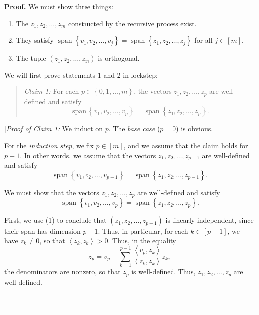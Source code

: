 \documentclass[numbers=enddot,12pt,final,onecolumn,notitlepage]{scrartcl}%
\numberwithin{exer}{subsection}
\theoremstyle{definition}
\newenvironment{statement}{\begin{quote}}{\end{quote}}
\newenvironment{proof}[1][Proof]{\noindent\textbf{#1.} }{\ \rule{0.5em}{0.5em}}
\let\sumnonlimits\sum
\renewcommand{\sum}{\sumnonlimits\limits}
\begin{document}
\begin{proof}
We must show three things:

\begin{enumerate}
\item The $z_{1},z_{2},\ldots,z_{m}$ constructed by the recursive process exist.

\item They satisfy $\operatorname*{span}\left\{  v_{1},v_{2},\ldots
,v_{j}\right\}  =\operatorname*{span}\left\{  z_{1},z_{2},\ldots
,z_{j}\right\}  $ for all $j\in\left[  m\right]  $.

\item The tuple $\left(  z_{1},z_{2},\ldots,z_{m}\right)  $ is orthogonal.
\end{enumerate}

We will first prove statements 1 and 2 in lockstep:

\begin{statement}
\textit{Claim 1:} For each $p\in\left\{  0,1,\ldots,m\right\}  $, the vectors
$z_{1},z_{2},\ldots,z_{p}$ are well-defined and satisfy%
\[
\operatorname*{span}\left\{  v_{1},v_{2},\ldots,v_{p}\right\}
=\operatorname*{span}\left\{  z_{1},z_{2},\ldots,z_{p}\right\}  .
\]

\end{statement}

[\textit{Proof of Claim 1:} We induct on $p$. The \textit{base case} ($p=0$)
is obvious.

For the \textit{induction step}, we fix $p\in\left[  m\right]  $, and we
assume that the claim holds for $p-1$. In other words, we assume that the
vectors $z_{1},z_{2},\ldots,z_{p-1}$ are well-defined and satisfy%
\begin{equation}
\operatorname*{span}\left\{  v_{1},v_{2},\ldots,v_{p-1}\right\}
=\operatorname*{span}\left\{  z_{1},z_{2},\ldots,z_{p-1}\right\}  . \label{1}%
\end{equation}


We must show that the vectors $z_{1},z_{2},\ldots,z_{p}$ are well-defined and
satisfy%
\begin{equation}
\operatorname*{span}\left\{  v_{1},v_{2},\ldots,v_{p}\right\}
=\operatorname*{span}\left\{  z_{1},z_{2},\ldots,z_{p}\right\}  . \label{2}%
\end{equation}


First, we use (1) to conclude that $\left(  z_{1},z_{2},\ldots,z_{p-1}\right)
$ is linearly independent, since their span has dimension $p-1$. Thus, in
particular, for each $k\in\left[  p-1\right]  $, we have $z_{k}\neq0$, so that
$\left\langle z_{k},z_{k}\right\rangle >0$. Thus, in the equality%
\begin{equation}
z_{p}=v_{p}-\sum_{k=1}^{p-1}\dfrac{\left\langle v_{p},z_{k}\right\rangle
}{\left\langle z_{k},z_{k}\right\rangle }z_{k}, \label{3}%
\end{equation}
the denominators are nonzero, so that $z_{p}$ is well-defined. Thus,
$z_{1},z_{2},\ldots,z_{p}$ are well-defined.


\end{proof}
\end{document}
